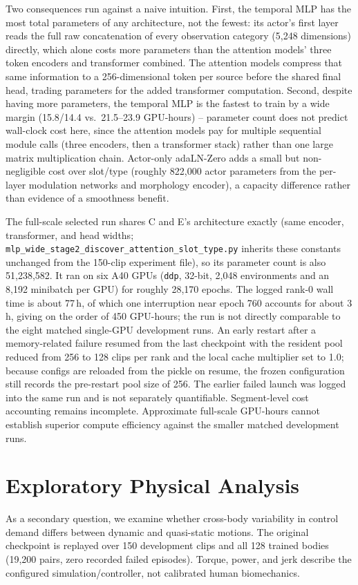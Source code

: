 \documentclass[11pt]{article}
\begin{document}
Two consequences run against a naive intuition. First, the temporal MLP has
the most total parameters of any architecture, not the fewest: its actor's
first layer reads the full raw concatenation of every observation category
(5,248 dimensions) directly, which alone costs more parameters than the
attention models' three token encoders and transformer combined. The
attention models compress that same information to a 256-dimensional token
per source before the shared final head, trading parameters for the added
transformer computation. Second, despite having more parameters, the temporal
MLP is the fastest to train by a wide margin (15.8/14.4 vs.\ 21.5--23.9
GPU-hours) -- parameter count does not predict wall-clock cost here, since the
attention models pay for multiple sequential module calls (three encoders,
then a transformer stack) rather than one large matrix multiplication chain.
Actor-only adaLN-Zero adds a small but non-negligible cost over slot/type
(roughly 822,000 actor parameters from the per-layer modulation networks and
morphology encoder), a capacity difference rather than evidence of a smoothness benefit.

The full-scale selected run shares C and E's architecture exactly (same
encoder, transformer, and head widths;
\texttt{mlp\_wide\_stage2\_discover\_attention\_slot\_type.py} inherits
these constants unchanged from the 150-clip experiment file), so its
parameter count is also 51,238,582. It ran on six A40 GPUs
(\texttt{ddp}, 32-bit, 2,048 environments and an 8,192 minibatch per GPU) for
roughly 28,170 epochs. The logged rank-0 wall time is about 77\,h, of which
one interruption near epoch 760 accounts for about 3\,h, giving on the order
of 450 GPU-hours; the run is not directly comparable to the eight matched
single-GPU development runs. An early restart after a memory-related failure
resumed from the last checkpoint with the resident pool reduced from 256 to
128 clips per rank and the local cache multiplier set to 1.0; because
configs are reloaded from the pickle on resume, the frozen configuration
still records the pre-restart pool size of 256. The earlier failed launch was
logged into the same run and is not separately quantifiable.
Segment-level cost accounting remains incomplete. Approximate full-scale
GPU-hours cannot establish superior compute efficiency against the smaller
matched development runs.

\section{Exploratory Physical Analysis}\label{sec:physics}
As a secondary question, we examine whether cross-body variability in
control demand differs between dynamic and quasi-static motions. The original
checkpoint is replayed over 150 development clips and all 128 trained bodies
(19,200 pairs, zero recorded failed episodes). Torque, power, and jerk describe
the configured simulation/controller, not calibrated human biomechanics.
\end{document}
